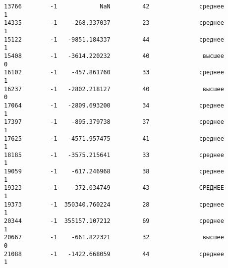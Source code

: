 \documentclass[11pt]{article}
\begin{document}
\begin{Verbatim}[commandchars=\\\{\}]
13766        -1            NaN         42              среднее             1
14335        -1    -268.337037         23              среднее             1
15122        -1   -9851.184337         44              среднее             1
15408        -1   -3614.220232         40               высшее             0
16102        -1    -457.861760         33              среднее             1
16237        -1   -2802.218127         40               высшее             0
17064        -1   -2809.693200         34              среднее             1
17397        -1    -895.379738         37              среднее             1
17625        -1   -4571.957475         41              среднее             1
18185        -1   -3575.215641         33              среднее             1
19059        -1    -617.246968         38              среднее             1
19323        -1    -372.034749         43              СРЕДНЕЕ             1
19373        -1  350340.760224         28              среднее             1
20344        -1  355157.107212         69              среднее             1
20667        -1    -661.822321         32               высшее             0
21088        -1   -1422.668059         44              среднее             1


\end{Verbatim}
\end{document}
